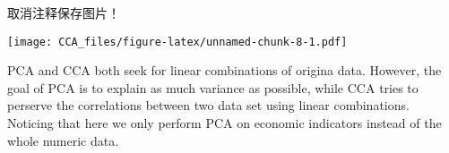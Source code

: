 \documentclass[
]{ctexart}
\newenvironment{Shaded}{\begin{snugshade}}{\end{snugshade}}
\newcommand{\AttributeTok}[1]{\textcolor[rgb]{0.77,0.63,0.00}{#1}}
\newcommand{\CommentTok}[1]{\textcolor[rgb]{0.56,0.35,0.01}{\textit{#1}}}
\newcommand{\DecValTok}[1]{\textcolor[rgb]{0.00,0.00,0.81}{#1}}
\newcommand{\FunctionTok}[1]{\textcolor[rgb]{0.00,0.00,0.00}{#1}}
\newcommand{\NormalTok}[1]{#1}
\newcommand{\OtherTok}[1]{\textcolor[rgb]{0.56,0.35,0.01}{#1}}
\newcommand{\SpecialCharTok}[1]{\textcolor[rgb]{0.00,0.00,0.00}{#1}}
\newcommand{\StringTok}[1]{\textcolor[rgb]{0.31,0.60,0.02}{#1}}
\begin{document}
取消注释保存图片！

\begin{Shaded}
\end{Shaded}

\texttt{[image: CCA\_files/figure-latex/unnamed-chunk-8-1.pdf]}

PCA and CCA both seek for linear combinations of origina data. However,
the goal of PCA is to explain as much variance as possible, while CCA
tries to perserve the correlations between two data set using linear
combinations. Noticing that here we only perform PCA on economic
indicators instead of the whole numeric data.
\end{document}
